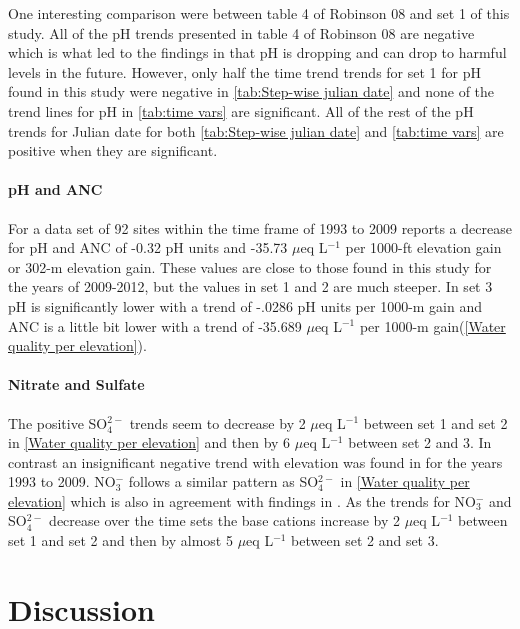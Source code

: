 One interesting comparison were between table 4 of Robinson 08 and set 1 of this study. All of the pH trends presented in table 4 of Robinson 08 are negative which is what led to the findings in \citet{robinson2008ph} that pH is dropping and can drop to harmful levels in the future. However, only half the time trend trends for set 1 for pH found in this study were negative in \autoref{tab:Step-wise julian date} and none of the trend lines for pH in \autoref{tab:time vars} are significant. All of the rest of the pH trends for Julian date for both \autoref{tab:Step-wise julian date} and \autoref{tab:time vars} are positive when they are significant.

\paragraph{pH and ANC}
For a data set of 92 sites within the time frame of 1993 to 2009 \citet{cai2012} reports a decrease for pH and ANC of -0.32 pH units and -35.73 $\mu$eq L$^{-1}$ per 1000-ft elevation gain or 302-m elevation gain.  These values are close to those found in this study for the years of 2009-2012, but the values in set 1 and 2 are much steeper.  In set 3 pH is significantly lower with a trend of -.0286 pH units per 1000-m gain and ANC is a little bit lower with a trend of -35.689 $\mu$eq L$^{-1}$ per 1000-m gain(\autoref{Water quality per elevation}).  

\paragraph{Nitrate and Sulfate}
The positive SO$_4^{2-}$ trends seem to decrease by 2 $\mu$eq L$^{-1}$ between set 1 and set 2 in \autoref{Water quality per elevation} and then by 6  $\mu$eq L$^{-1}$ between set 2 and 3.  In contrast an insignificant negative trend with elevation was found in \citet{cai2012} for the years 1993 to 2009.  NO$_3^-$ follows a similar pattern as SO$_4^{2-}$ in \autoref{Water quality per elevation} which is also in agreement with findings in \citet{weathers2006}.  As the trends for  NO$_3^-$ and SO$_4^{2-}$ decrease over the time sets the base cations increase by 2 $\mu$eq L$^{-1}$ between set 1 and set 2 and then by almost 5 $\mu$eq L$^{-1}$ between set 2 and set 3.

\section{Discussion}

